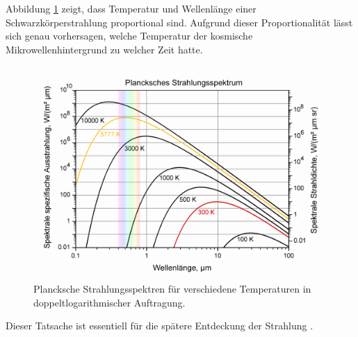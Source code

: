 Abbildung \ref{fig:blackbody_spectrum} zeigt, dass Temperatur und Wellenlänge einer Schwarzkörperstrahlung proportional sind.
Aufgrund dieser Proportionalität lässt sich genau vorhersagen, welche Temperatur der kosmische Mikrowellenhintergrund zu welcher Zeit hatte.
\begin{figure}
	\centering
	\includegraphics[width=0.7\linewidth]{cmb/images/blackbody_spectrum.png}
	\caption{Plancksche Strahlungsspektren für verschiedene Temperaturen in 
	doppelt\-loga\-rith\-mischer Auftragung.}
	\label{fig:blackbody_spectrum}
\end{figure}
Dieser Tatsache ist essentiell für die spätere Entdeckung der Strahlung
\cite{cmb:intro}.
